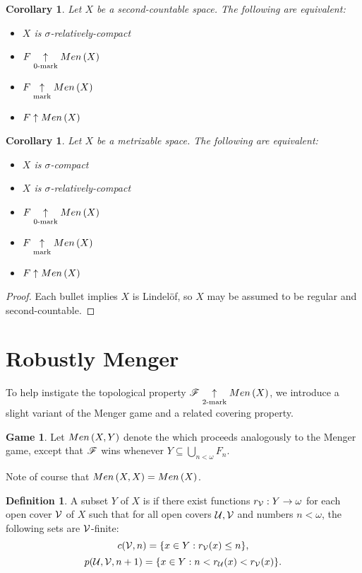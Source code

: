\documentclass{amsart}
\newtheorem{corollary}[theorem]{Corollary}
\theoremstyle{definition}
\newtheorem{definition}[theorem]{Definition}
\newtheorem{game}[theorem]{Game}
\begin{document}
\begin{corollary}
  Let \(X\) be a second-countable space. The following are equivalent:
  \begin{itemize}
    \item \(X\) is \(\sigma\)-relatively-compact
    \item \(F \underset{0\text{-mark}}{\uparrow} Men\left({X}\right)\)
    \item \(F \underset{\text{mark}}{\uparrow} Men\left({X}\right)\)
    \item \(F \uparrow Men\left({X}\right)\)
  \end{itemize}
\end{corollary}

\begin{corollary}
  Let \(X\) be a metrizable space. The following are equivalent:
  \begin{itemize}
    \item \(X\) is \(\sigma\)-compact
    \item \(X\) is \(\sigma\)-relatively-compact
    \item \(F \underset{0\text{-mark}}{\uparrow} Men\left({X}\right)\)
    \item \(F \underset{\text{mark}}{\uparrow} Men\left({X}\right)\)
    \item \(F \uparrow Men\left({X}\right)\)
  \end{itemize}
\end{corollary}

\begin{proof}
  Each bullet implies \(X\) is Lindel\"of, so \(X\) may be assumed to be
  regular and second-countable.
\end{proof}



\section{Robustly Menger}

To help instigate the topological property \(\mathscr{F}\underset{2\text{-mark}}{\uparrow}Men\left({X}\right)\),
we introduce a
slight variant of the Menger game and a related covering property.

\begin{game}
  Let \(Men\left({X,Y}\right)\) denote the  which proceeds
  analogously to the Menger game, except that \(\mathscr{F}\) wins whenever
  \(Y\subseteq\bigcup_{n<\omega} F_n\).
\end{game}

Note of course that \(Men\left({X,X}\right)=Men\left({X}\right)\).

\begin{definition}
  A subset \(Y\) of \(X\) is  if there exist
  functions \(r_{\mathcal{V}}:Y\to\omega\)
  for each open cover \(\mathcal{V}\) of \(X\) such that
  for all open covers \(\mathcal{U},\mathcal{V}\) and numbers \(n<\omega\),
  the following sets are \(\mathcal{V}\)-finite:
    \[
      c(\mathcal{V},n)=\{ x\in Y : r_{\mathcal{V}}(x)\leq n\}
    ,\]
    \[
      p(\mathcal{U},\mathcal{V},n+1)=\{ x\in Y : n<r_{\mathcal{U}}(x)<r_{\mathcal{V}}(x)\}
    .\]
\end{definition}
\end{document}
